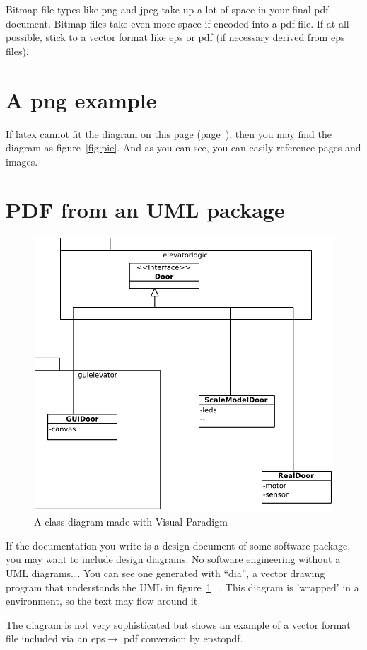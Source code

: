 Bitmap file types like png and jpeg take up a lot of space in your
final pdf document. 
Bitmap files take even more space if encoded into a pdf file.
If at all possible, stick to a vector format like eps or pdf (if
necessary derived from eps files). 


\section{A png example}
\label{page:pngexample}
If latex cannot fit the diagram on this page
(page~\pageref{page:pngexample}), 
 then you may find the diagram as figure~\vref{fig:pie}. And as you
 can see, you can easily reference pages and images.

\section{PDF from an UML package} 
\label{sec:pdffromuml}
\begin{figure}

  \includegraphics[width=.4\textwidth]{images/doorsystem.pdf}
  \caption{A class diagram made with Visual Paradigm}
  \label{fig:classdiagram}
\end{figure}
If the documentation you write is a design document of some software
package, you may want to include design diagrams.
No software engineering without a UML diagrams\ldots.
You can see one generated with ``dia'', a vector drawing program that
understands the UML in figure~\ref{fig:classdiagram}
~. This diagram is 'wrapped' in a  environment, so the text may flow around it

The diagram is not very sophisticated but shows an example of a vector
format file included via an eps$\rightarrow$ pdf conversion by
epstopdf.

